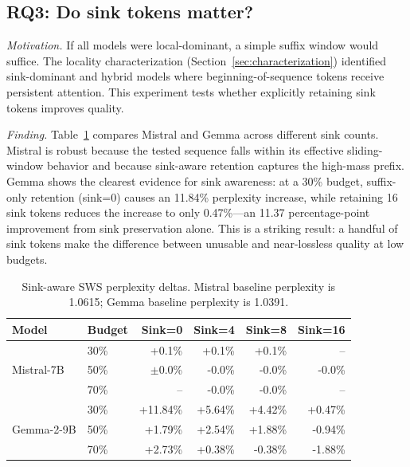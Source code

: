 \documentclass[11pt]{article}
\newcommand{\sws}{SWS}
\newcommand{\pct}{\%}
\theoremstyle{definition}
\theoremstyle{plain}
\begin{document}
\subsection{RQ3: Do sink tokens matter?}
\label{sec:rq3}

\emph{Motivation.}  If all models were local-dominant, a simple suffix window would suffice.  The locality characterization (Section~\ref{sec:characterization}) identified sink-dominant and hybrid models where beginning-of-sequence tokens receive persistent attention.  This experiment tests whether explicitly retaining sink tokens improves quality.

\emph{Finding.}  Table~\ref{tab:sink-results} compares Mistral and Gemma across different sink counts.  Mistral is robust because the tested sequence falls within its effective sliding-window behavior and because sink-aware retention captures the high-mass prefix.  Gemma shows the clearest evidence for sink awareness: at a 30\pct{} budget, suffix-only retention (sink=0) causes an 11.84\pct{} perplexity increase, while retaining 16 sink tokens reduces the increase to only 0.47\pct{}---an 11.37 percentage-point improvement from sink preservation alone.  This is a striking result: a handful of sink tokens make the difference between unusable and near-lossless quality at low budgets.

\begin{table}[t]
\centering
\caption{Sink-aware \sws{} perplexity deltas.  Mistral baseline perplexity is 1.0615; Gemma baseline perplexity is 1.0391.}
\label{tab:sink-results}
\small
\begin{tabular}{llrrrr}
\toprule
Model & Budget & Sink=0 & Sink=4 & Sink=8 & Sink=16 \\
\midrule
\multirow{3}{*}{Mistral-7B} 
  & 30\pct{} & +0.1\pct{} & +0.1\pct{} & +0.1\pct{} & -- \\
  & 50\pct{} & $\pm$0.0\pct{} & -0.0\pct{} & -0.0\pct{} & -0.0\pct{} \\
  & 70\pct{} & -- & -0.0\pct{} & -0.0\pct{} & -- \\
\midrule
\multirow{3}{*}{Gemma-2-9B} 
  & 30\pct{} & +11.84\pct{} & +5.64\pct{} & +4.42\pct{} & +0.47\pct{} \\
  & 50\pct{} & +1.79\pct{} & +2.54\pct{} & +1.88\pct{} & -0.94\pct{} \\
  & 70\pct{} & +2.73\pct{} & +0.38\pct{} & -0.38\pct{} & -1.88\pct{} \\
\bottomrule
\end{tabular}
\end{table}
\end{document}
